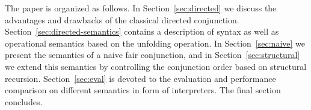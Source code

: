 The paper is organized as follows. In Section~\ref{sec:directed} we discuss the advantages and drawbacks of the classical directed conjunction. Section~\ref{sec:directed-semantics} contains a
description of \mk syntax as well as operational semantics based on the unfolding operation. In Section~\ref{sec:naive} we present the semantics of a naive fair conjunction,
and in Section~\ref{sec:structural} we extend this semantics by controlling the conjunction order based on structural recursion. Section~\ref{sec:eval} is devoted to the evaluation
and performance comparison on different semantics in form of interpreters. The final section concludes.
